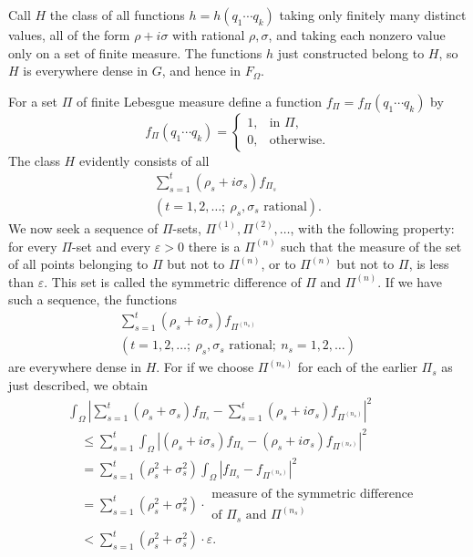 \documentclass[fontsize=13pt,twoside,openany,headings=normal,parskip=false,bookmarkpackage=false,DIV=calc]{scrbook}
\begin{document}
\hypertarget{origpage-35}{}%
Call $H$ the class of all functions $h=h(q_1\cdots q_k)$ taking only finitely many distinct values, all of the form $\rho+i\sigma$ with rational $\rho,\sigma$, and taking each nonzero value only on a set of finite measure. The functions $h$ just constructed belong to $H$, so $H$ is everywhere dense in $G$, and hence in $F_\Omega$.

For a set $\Pi$ of finite Lebesgue measure define a function $f_\Pi=f_\Pi(q_1\cdots q_k)$ by
\[
f_\Pi(q_1\cdots q_k)=\begin{cases}1,&\text{in }\Pi,\\0,&\text{otherwise}.\end{cases}
\]
The class $H$ evidently consists of all
\begin{gather*}
\sum_{s=1}^t(\rho_s+i\sigma_s)f_{\Pi_s}\\
(t=1,2,\ldots;\ \rho_s,\sigma_s\text{ rational}).
\end{gather*}
We now seek a sequence of $\Pi$-sets, $\Pi^{(1)},\Pi^{(2)},\ldots$, with the following property: for every $\Pi$-set and every $\varepsilon>0$ there is a $\Pi^{(n)}$ such that the measure of the set of all points belonging to $\Pi$ but not to $\Pi^{(n)}$, or to $\Pi^{(n)}$ but not to $\Pi$, is less than $\varepsilon$. This set is called the symmetric difference of $\Pi$ and $\Pi^{(n)}$. If we have such a sequence, the functions
\begin{gather*}
\sum_{s=1}^t(\rho_s+i\sigma_s)f_{\Pi^{(n_s)}}\\
(t=1,2,\ldots;\ \rho_s,\sigma_s\text{ rational};\ n_s=1,2,\ldots)
\end{gather*}
are everywhere dense in $H$. For if we choose $\Pi^{(n_s)}$ for each of the earlier $\Pi_s$ as just described, we obtain
\begin{align*}
&\int_\Omega\left|\sum_{s=1}^t(\rho_s+\sigma_s)f_{\Pi_s}-\sum_{s=1}^t(\rho_s+i\sigma_s)f_{\Pi^{(n_s)}}\right|^2\\
&\quad\leq\sum_{s=1}^t\int_\Omega\left|(\rho_s+i\sigma_s)f_{\Pi_s}-(\rho_s+i\sigma_s)f_{\Pi^{(n_s)}}\right|^2\\
&\quad=\sum_{s=1}^t(\rho_s^2+\sigma_s^2)\int_\Omega|f_{\Pi_s}-f_{\Pi^{(n_s)}}|^2\\
&\quad=\sum_{s=1}^t(\rho_s^2+\sigma_s^2)\cdot\substack{\text{measure of the symmetric difference}\\\text{of }\Pi_s\text{ and }\Pi^{(n_s)}}\\
&\quad<\sum_{s=1}^t(\rho_s^2+\sigma_s^2)\cdot\varepsilon.
\end{align*}
\end{document}
